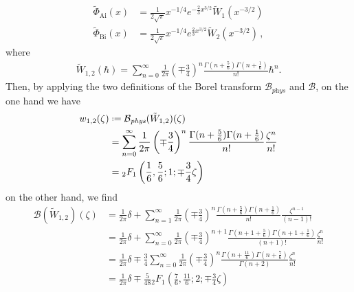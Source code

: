 \documentclass{article}
\newcommand{\series}[1]{\tilde{#1}}
\newcommand*{\defeq}{\mathrel{\vcenter{\baselineskip0.5ex \lineskiplimit0pt
                     \hbox{\scriptsize.}\hbox{\scriptsize.}}}%
                     =}
\newcommand{\borel}{\mathcal{B}}
\theoremstyle{definition}
\theoremstyle{plain}
\begin{document}
\begin{align*}
\series{\Phi}_{\mathrm{Ai}}(x)&=\frac{1}{2\sqrt{\pi}}x^{-1/4}e^{-\tfrac{2}{3}x^{3/2}}\tilde{W}_1(x^{-3/2})\\
\series{\Phi}_{\mathrm{Bi}}(x)&=\frac{1}{2\sqrt{\pi}}x^{-1/4}e^{\tfrac{2}{3}x^{3/2}}\tilde{W}_2(x^{-3/2})\,,
\end{align*}  
where 
\begin{align*}
\tilde{W}_{1,2}(\hbar)=\sum_{n=0}^{\infty}\frac{1}{2\pi}\left(\mp\frac{3}{4}\right)^{n}\frac{\Gamma(n+\frac{5}{6})\Gamma(n+\frac{1}{6})}{n!}\hbar^n.
\end{align*}
Then, by applying the two definitions of the Borel transform $\borel_{\textit{phys}}$ and $\borel$, on the one hand we have  
\begin{align*}
w_{1,2}(\zeta)&\defeq\borel_{\textit{phys}}(\tilde{W}_{1,2})(\zeta)\\
&=\sum_{n=0}^{\infty}\frac{1}{2\pi}\left(\mp\frac{3}{4}\right)^{n}\frac{\Gamma(n+\frac{5}{6})\Gamma(n+\frac{1}{6})}{n!}\frac{\zeta^n}{n!}\\
&={}_2F_1\left(\frac{1}{6},\frac{5}{6};1;\mp\frac{3}{4}\zeta\right) 
\end{align*}
on the other hand, we find
\begin{align*}
\borel(\tilde{W}_{1,2})(\zeta)&=\frac{1}{2\pi}\delta+\sum_{n=1}^{\infty} \frac{1}{2\pi}\left(\mp\frac{3}{4}\right)^{n}\frac{\Gamma(n+\frac{5}{6})\Gamma(n+\frac{1}{6})}{n!}\frac{\zeta^{n-1}}{(n-1)!}\\
&=\frac{1}{2\pi}\delta+\sum_{n=0}^{\infty} \frac{1}{2\pi}\left(\mp\frac{3}{4}\right)^{n+1}\frac{\Gamma(n+1+\frac{5}{6})\Gamma(n+1+\frac{1}{6})}{(n+1)!}\frac{\zeta^{n}}{n!}\\
&=\frac{1}{2\pi}\delta\mp\frac{3}{4}\sum_{n=0}^{\infty} \frac{1}{2\pi}\left(\mp\frac{3}{4}\right)^{n}\frac{\Gamma(n+\frac{11}{6})\Gamma(n+\frac{7}{6})}{\Gamma(n+2)}\frac{\zeta^{n}}{n!}\\
&=\frac{1}{2\pi}\delta\mp\frac{5}{48} {}_2F_1\left(\frac{7}{6},\frac{11}{6};2;\mp\frac{3}{4}\zeta\right)%
\end{align*}
\end{document}

